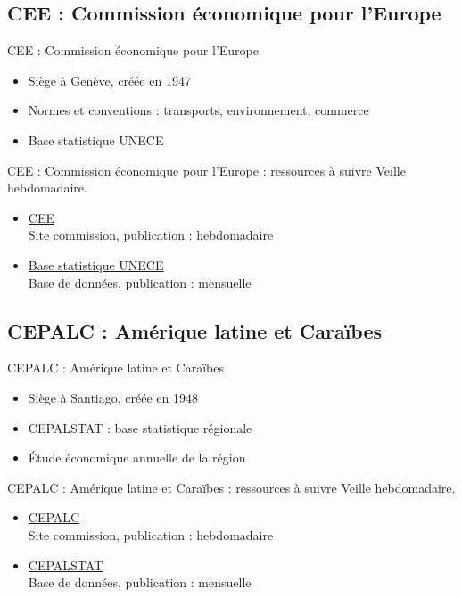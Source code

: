 \documentclass[aspectratio=169,11pt]{beamer}
\begin{document}
\subsection{CEE : Commission économique pour l'Europe}
\begin{frame}{CEE : Commission économique pour l'Europe}
\begin{itemize}
\item Siège à Genève, créée en 1947
\item Normes et conventions : transports, environnement, commerce
\item Base statistique UNECE
\end{itemize}
\end{frame}

\begin{frame}{CEE : Commission économique pour l'Europe : ressources à suivre}
\small
Veille hebdomadaire.
\begin{itemize}
\item \href{https://unece.org}{CEE}\\{\footnotesize Site commission, publication : hebdomadaire}
\item \href{https://w3.unece.org/PXWeb2015/pxweb/en/STAT}{Base statistique UNECE}\\{\footnotesize Base de données, publication : mensuelle}
\end{itemize}
\end{frame}

\subsection{CEPALC : Amérique latine et Caraïbes}
\begin{frame}{CEPALC : Amérique latine et Caraïbes}
\begin{itemize}
\item Siège à Santiago, créée en 1948
\item CEPALSTAT : base statistique régionale
\item Étude économique annuelle de la région
\end{itemize}
\end{frame}

\begin{frame}{CEPALC : Amérique latine et Caraïbes : ressources à suivre}
\small
Veille hebdomadaire.
\begin{itemize}
\item \href{https://www.cepal.org}{CEPALC}\\{\footnotesize Site commission, publication : hebdomadaire}
\item \href{https://statistics.cepal.org}{CEPALSTAT}\\{\footnotesize Base de données, publication : mensuelle}
\end{itemize}
\end{frame}
\end{document}
